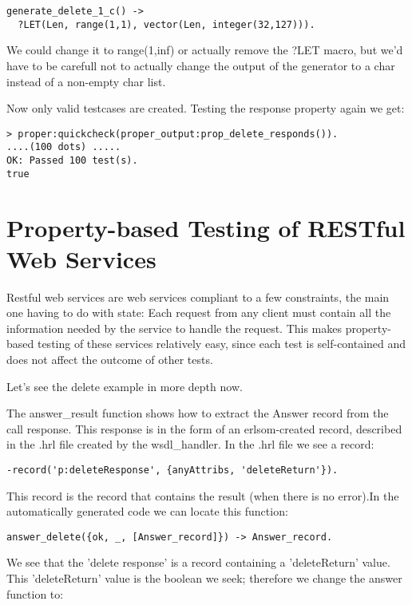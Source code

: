 \documentclass[submission,copyright,a4]{eptcs}
\begin{document}
\begin{lstlisting}
generate_delete_1_c() ->
  ?LET(Len, range(1,1), vector(Len, integer(32,127))).
\end{lstlisting}
We could change it to range(1,inf) or actually remove the ?LET macro, but we'd have to be carefull not to actually change the output of the generator to a char instead of a non-empty char list.

Now only valid testcases are created. Testing the response property again we get:
\begin{lstlisting}
> proper:quickcheck(proper_output:prop_delete_responds()).
....(100 dots) .....
OK: Passed 100 test(s).
true
\end{lstlisting}

\section{Property-based Testing of RESTful Web Services}

Restful web services are web services compliant to a few constraints, the main one having to do with state: Each request from any client must contain all the information needed by the service to handle the request. This makes property-based testing of these services relatively easy, since each test is self-contained and does not affect the outcome of other tests. 

Let's see the delete example in more depth now. 

The answer\_result function shows how to extract the Answer record from the call response. This response is in the form of an erlsom-created record, described in the .hrl file created by the wsdl\_handler. In the .hrl file we see a record: 
\begin{lstlisting}
-record('p:deleteResponse', {anyAttribs, 'deleteReturn'}).
\end{lstlisting}

This record is the record that contains the result (when there is no error).In the automatically generated code we can locate this function:

\begin{lstlisting}
answer_delete({ok, _, [Answer_record]}) -> Answer_record.
\end{lstlisting}

We see that the 'delete response' is a record containing a 'deleteReturn' value. This 'deleteReturn' value is the boolean we seek; therefore we change the answer function to:
\end{document}

